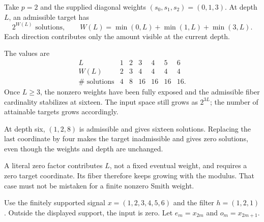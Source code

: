Take $p=2$ and the supplied diagonal weights $(s_0,s_1,s_2)=(0,1,3)$. At depth $L$, an admissible target has
\[
2^{W(L)}\text{ solutions},\qquad
W(L)=\min(0,L)+\min(1,L)+\min(3,L).
\]
Each direction contributes only the amount visible at the current depth.


The values are
\[
\begin{array}{c|rrrrrr}
L&1&2&3&4&5&6\\\hline
W(L)&2&3&4&4&4&4\\
\#\text{ solutions}&4&8&16&16&16&16.
\end{array}
\]
Once $L\ge3$, the nonzero weights have been fully exposed and the admissible fiber cardinality stabilizes at sixteen. The input space still grows as $2^{3L}$; the number of attainable targets grows accordingly.

At depth six, $(1,2,8)$ is admissible and gives sixteen solutions. Replacing the last coordinate by four makes the target inadmissible and gives zero solutions, even though the weights and depth are unchanged.

A literal zero factor contributes $L$, not a fixed eventual weight, and requires a zero target coordinate. Its fiber therefore keeps growing with the modulus. That case must not be mistaken for a finite nonzero Smith weight.


Use the finitely supported signal $x=(1,2,3,4,5,6)$ and the filter $h=(1,2,1)$. Outside the displayed support, the input is zero. Let $e_m=x_{2m}$ and $o_m=x_{2m+1}$.


